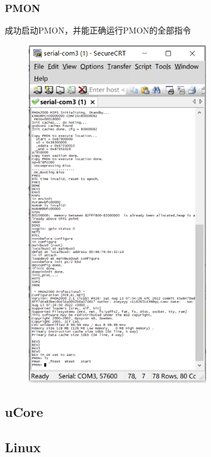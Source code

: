 \documentclass{beamer}
\begin{document}
\begin{frame}
    \frametitle{PMON}

    \begin{minipage}[c]{0.4\linewidth}
        成功启动PMON，并能正确运行PMON的全部指令
    \end{minipage}
    \hfill
    \begin{minipage}{0.5\linewidth}
        \begin{figure}
            \centering
            \includegraphics[width=0.7\textwidth]{pic/PMON.png}
        \end{figure}
    \end{minipage}

\end{frame}

\subsection{uCore}

\subsection{Linux}
\end{document}
